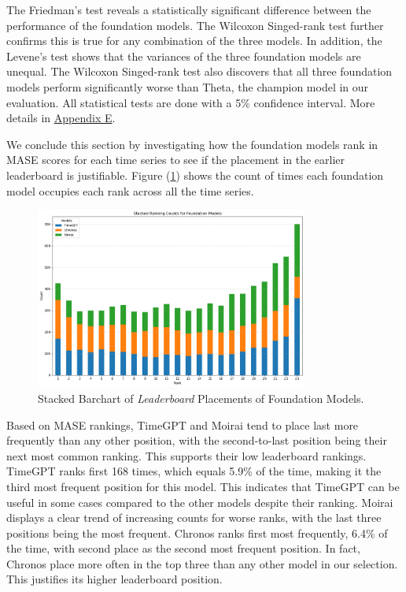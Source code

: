 \documentclass[12pt,a4paper]{article}
\begin{document}
The Friedman’s test reveals a statistically significant difference between the performance of the foundation models. The Wilcoxon Singed-rank test further confirms this is true for any combination of the three models. In addition, the Levene’s test shows that the variances of the three foundation models are unequal. The Wilcoxon Singed-rank test also discovers that all three foundation models perform significantly worse than Theta, the champion model in our evaluation. All statistical tests are done with a 5\% confidence interval. More details in \hyperref[appendix_e]{Appendix E}.

We conclude this section by investigating how the foundation models rank in MASE scores for each time series to see if the placement in the earlier leaderboard is justifiable. Figure (\ref{stacked_ranking_count}) shows the count of times each foundation model occupies each rank across all the time series.

\begin{figure}[htbp]
  \centering
  \includegraphics[width=0.8\textwidth]{real_stacked_counts.png}
  \caption{Stacked Barchart of \textit{Leaderboard} Placements of Foundation Models.}
  \label{stacked_ranking_count}
\end{figure}

Based on MASE rankings, TimeGPT and Moirai tend to place last more frequently than any other position, with the second-to-last position being their next most common ranking. This supports their low leaderboard rankings. TimeGPT ranks first 168 times, which equals 5.9\% of the time, making it the third most frequent position for this model. This indicates that TimeGPT can be useful in some cases compared to the other models despite their ranking. Moirai displays a clear trend of increasing counts for worse ranks, with the last three positions being the most frequent. Chronos ranks first most frequently, 6.4\% of the time, with second place as the second most frequent position. In fact, Chronos place more often in the top three than any other model in our selection. This justifies its higher leaderboard position. 
\end{document}
